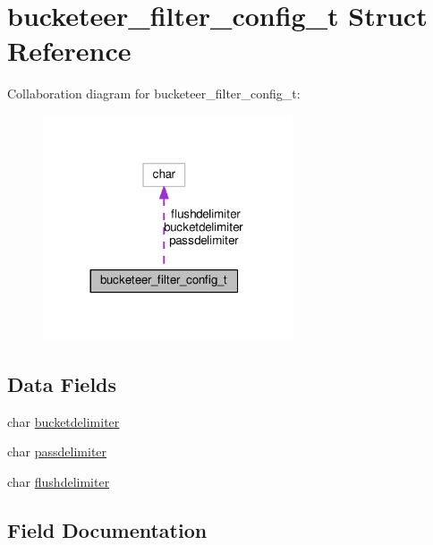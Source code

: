 \hypertarget{structbucketeer__filter__config__t}{}\section{bucketeer\+\_\+filter\+\_\+config\+\_\+t Struct Reference}
\label{structbucketeer__filter__config__t}


Collaboration diagram for bucketeer\+\_\+filter\+\_\+config\+\_\+t\+:
\nopagebreak
\begin{figure}[H]
\begin{center}
\leavevmode
\includegraphics[width=209pt]{structbucketeer__filter__config__t__coll__graph}
\end{center}
\end{figure}
\subsection*{Data Fields}
\begin{DoxyCompactItemize}
\item 
char \hyperlink{structbucketeer__filter__config__t_a533532fb8758489797f5673695e5e73e}{bucketdelimiter}
\item 
char \hyperlink{structbucketeer__filter__config__t_ab1a77ee8ccdb7fae0af7b771064038c9}{passdelimiter}
\item 
char \hyperlink{structbucketeer__filter__config__t_aae9075ef9d51e83171cfd8c064ff5659}{flushdelimiter}
\end{DoxyCompactItemize}


\subsection{Field Documentation}
